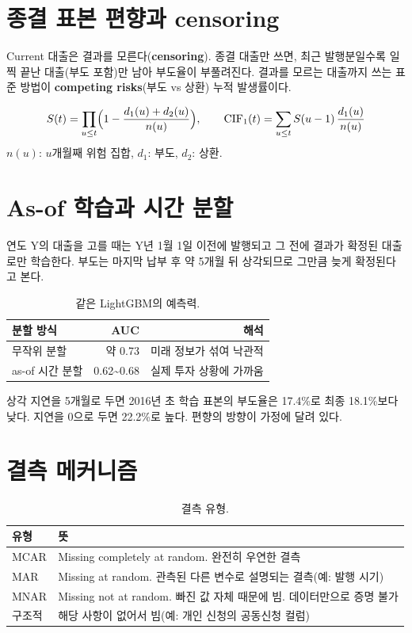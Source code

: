 \documentclass[11pt]{report}
\begin{document}
\section{종결 표본 편향과 censoring}
Current 대출은 결과를 모른다(\textbf{censoring}). 종결 대출만 쓰면, 최근 발행분일수록 일찍 끝난 대출(부도 포함)만 남아 부도율이 부풀려진다. 결과를 모르는 대출까지 쓰는 표준 방법이 \textbf{competing risks}(부도 vs 상환) 누적 발생률이다.

\begin{formulabox}
\[ S(t)=\prod_{u\le t}\Bigl(1-\frac{d_1(u)+d_2(u)}{n(u)}\Bigr),\qquad
\mathrm{CIF}_1(t)=\sum_{u\le t} S(u-1)\,\frac{d_1(u)}{n(u)} \]
$n(u)$: $u$개월째 위험 집합, $d_1$: 부도, $d_2$: 상환.
\end{formulabox}

\section{As-of 학습과 시간 분할}
연도 Y의 대출을 고를 때는 Y년 1월 1일 이전에 발행되고 그 전에 결과가 확정된 대출로만 학습한다. 부도는 마지막 납부 후 약 5개월 뒤 상각되므로 그만큼 늦게 확정된다고 본다.

\begin{table}[H]\centering\small
\begin{tabular}{@{}lrr@{}}\toprule
분할 방식 & AUC & 해석\\\midrule
무작위 분할 & 약 0.73 & 미래 정보가 섞여 낙관적\\
as-of 시간 분할 & 0.62\textasciitilde 0.68 & 실제 투자 상황에 가까움\\\bottomrule
\end{tabular}
\caption{같은 LightGBM의 예측력.}
\end{table}

\begin{warnbox}
상각 지연을 5개월로 두면 2016년 초 학습 표본의 부도율은 17.4\%로 최종 18.1\%보다 낮다. 지연을 0으로 두면 22.2\%로 높다. 편향의 방향이 가정에 달려 있다.
\end{warnbox}

\section{결측 메커니즘}
\begin{table}[H]\centering\small
\begin{tabularx}{\linewidth}{@{}lL@{}}\toprule
유형 & 뜻\\\midrule
MCAR & Missing completely at random. 완전히 우연한 결측\\
MAR & Missing at random. 관측된 다른 변수로 설명되는 결측(예: 발행 시기)\\
MNAR & Missing not at random. 빠진 값 자체 때문에 빔. 데이터만으로 증명 불가\\
구조적 & 해당 사항이 없어서 빔(예: 개인 신청의 공동신청 컬럼)\\\bottomrule
\end{tabularx}
\caption{결측 유형.}
\end{table}
\end{document}
